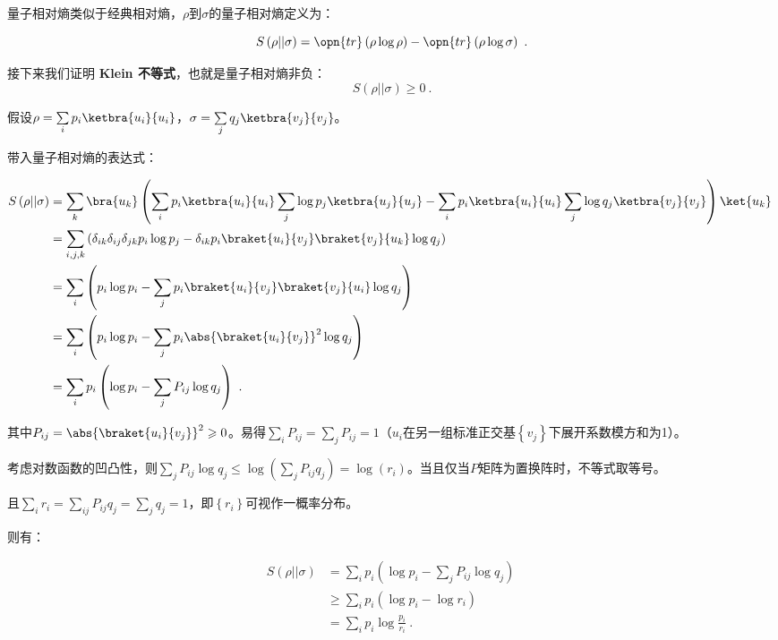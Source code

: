 量子相对熵类似于经典相对熵，$\rho$到$\sigma$的量子相对熵定义为：

\begin{equation}
S\left(\rho || \sigma\right) = \opn{tr}\left(\rho \log \rho\right) - \opn{tr}\left(\rho \log \sigma\right)~.
\end{equation}

接下来我们证明 \textbf{Klein 不等式}，也就是量子相对熵非负：
\begin{equation}\label{eq_vonNE_2}
S\left(\rho || \sigma\right) \geqslant 0~.
\end{equation}

假设$\rho = \sum\limits_ip_i\ketbra{u_i}{u_i}$，$\sigma = \sum\limits_jq_j\ketbra{v_j}{v_j}$。

带入量子相对熵的表达式：

\begin{equation}
\begin{aligned}
S\left(\rho || \sigma\right) &= \sum_k \bra{u_k}\left( \sum_ip_i\ketbra{u_i}{u_i}\sum_j\log p_j\ketbra{u_j}{u_j} - \sum_ip_i\ketbra{u_i}{u_i}\sum_j\log q_j\ketbra{v_j}{v_j} \right)\ket{u_k} \\
&= \sum_{i,j,k}\left(\delta_{ik}\delta_{ij}\delta_{jk}p_i\log p_j - \delta_{ik}p_i \braket{u_i}{v_j}\braket{v_j}{u_k}\log q_j \right) \\
&= \sum_i\left( p_i\log p_i - \sum_jp_i\braket{u_i}{v_j}\braket{v_j}{u_i}\log q_j  \right) \\
&= \sum_i\left(p_i\log p_i - \sum_j p_i\abs{\braket{u_i}{v_j}}^2\log q_j \right) \\
&= \sum_ip_i\left(\log p_i - \sum_j P_{ij}\log q_j\right)~.
\end{aligned}~
\end{equation}

其中$P_{ij} = \abs{\braket{u_i}{v_j}}^2 \geqslant 0$。易得$\sum\limits_i P_{ij} = \sum\limits_j P_{ij} = 1$（$u_i$在另一组标准正交基$\left\{v_j\right\}$下展开系数模方和为1）。

考虑对数函数的凹凸性，则$\sum\limits_j P_{ij}\log q_j \leqslant \log\left(\sum\limits_j P_{ij}q_j\right) = \log \left(r_i\right)$。当且仅当$P$矩阵为置换阵时，不等式取等号。

且$\sum\limits_i r_i = \sum\limits_{ij}P_{ij}q_j = \sum\limits_jq_j = 1$，即$\left\{r_i\right\}$可视作一概率分布。

则有：

\begin{equation}\label{eq_vonNE_1}
\begin{aligned}
S\left(\rho || \sigma\right) &= \sum_i p_i\left(\log p_i - \sum_j P_{ij}\log q_j\right) \\ 
&\geqslant\sum_i p_i\left(\log p_i - \log r_i\right) \\
&= \sum_i p_i\log\frac{p_i}{r_i}~.
\end{aligned}~
\end{equation}

